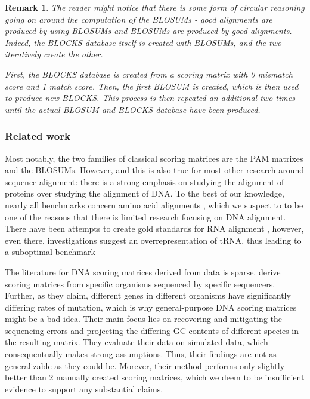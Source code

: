 \documentclass{article}
\newtheorem{remark}{Remark}
\begin{document}
\begin{remark}\label{emref}
	The reader might notice that there is some form of circular reasoning going on around
	the computation of the BLOSUMs - good alignments are produced by using BLOSUMs 
	and BLOSUMs are produced by good alignments. Indeed, the BLOCKS database
	itself is created with BLOSUMs, and the two iteratively create the other.

	First, the BLOCKS database is created from a scoring matrix with 0
	mismatch score and 1 match score. Then, the first BLOSUM is created,
	which is then used to produce new BLOCKS. This process is then repeated 
 	an additional two times until the actual BLOSUM and BLOCKS database have been
	produced.
\end{remark}

\subsubsection*{Related work}
Most notably, the two families of classical scoring matrices are the PAM matrixes \cite{dayhoffModelEvolutionaryChange1978} and the BLOSUMs. 
However, and this is also true for most other research around sequence alignment: there is a strong emphasis on studying the
alignment of proteins over studying the alignment of DNA. To the best of our
knowledge, nearly all benchmarks concern amino acid alignments \cite{gardnerBenchmarkMultipleSequence2005, pervezEvaluatingAccuracyEfficiency2014, thompsonBAliBASELatestDevelopments2005, vanwalleSABmarkBenchmarkSequence2005a}, which
we suspect to to be one of the reasons that there is limited research focusing
on DNA alignment. There have been attempts to create gold standards for RNA
alignment \cite{wilmEnhancedRNAAlignment2006},
however, even there, investigations suggest an overrepresentation of tRNA, thus
leading to a suboptimal benchmark \cite{lowesBRaliBaseDentTale2017}

The literature for DNA scoring matrices derived from data is sparse.
\textcite{hamadaTrainingAlignmentParameters2017} derive scoring matrices from
specific organisms sequenced by specific sequencers. Further, as they claim,
different genes in different organisms have significantly differing rates of
mutation, which is why general-purpose DNA scoring matrices might be a bad
idea. Their main focus lies on recovering and mitigating the sequencing errors
and projecting the differing GC contents of different species in the resulting
matrix. They evaluate their data on simulated data, which consequentually makes
strong assumptions. Thus, their findings are not as generalizable as they could be.
Morever, their method performs only slightly better than 2 manually created scoring matrices, which we deem to be insufficient evidence to support any substantial claims.
\end{document}
